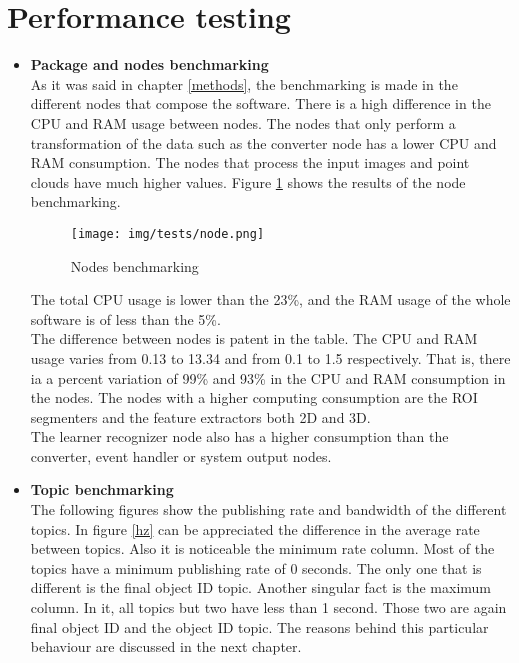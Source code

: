 \section{Performance testing}

	\begin{itemize}
		\item{\textbf{Package and nodes benchmarking}}
		\\

			As it was said in chapter \ref{methods}, the benchmarking is made in the different nodes that compose the software. 
			There is a high difference in the CPU and RAM usage between nodes.
			The nodes that only perform a transformation of the data such as the converter node has a lower CPU and RAM consumption.
			The nodes that process the input images and point clouds have much higher values. 
			Figure \ref{node} shows the results of the node benchmarking. 

			\begin{figure}[h]
				\begin{center}
			    \texttt{[image: img/tests/node.png]}
				\caption[Nodes benchmarking]{Nodes benchmarking}
				\label{node}
				\end{center}
			\end{figure}

			The total CPU usage is lower than the 23\%, and the RAM usage of the whole software is of less than the 5\%. 
			\\


			The difference between nodes is patent in the table.
			The CPU and RAM usage varies from  0.13 to 13.34 and from 0.1 to 1.5 respectively. 
			That is, there ia a percent variation of 99\% and  93\%  in the CPU and RAM consumption in the nodes. 
			The nodes with a higher computing consumption are the ROI segmenters and the feature extractors both 2D and 3D.
			\\

			The learner recognizer node also has a higher consumption than the converter, event handler or system output nodes. 
			
			\newpage

		\item{\textbf{Topic benchmarking}}\\

			The following figures show the publishing rate and bandwidth of the different topics. 
			In figure \ref{hz} can be appreciated the difference in the average rate between topics. 
			Also it is noticeable the minimum rate column. 
			Most of the topics have a minimum publishing rate of 0 seconds.
			The only one that is different is the final object ID topic. 
			Another singular fact is the maximum column. 
			In it, all topics but two have less than 1 second. 
			Those two are again final object ID and the object ID topic. 
			The reasons behind this particular behaviour are discussed in the next chapter. 


\end{itemize}
